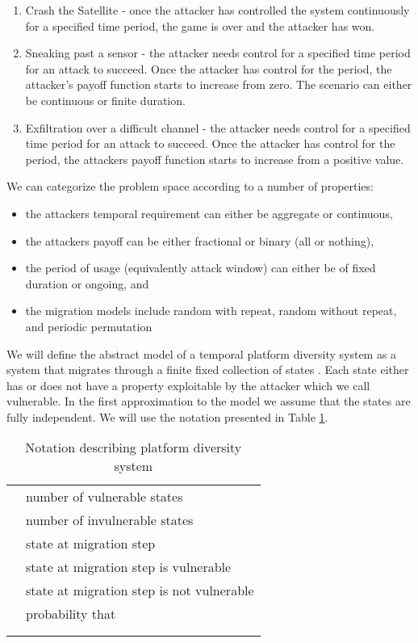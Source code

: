 \documentclass{acm_proc_article-sp}
\providecommand{\tabularnewline}{\\}
\begin{document}
\begin{enumerate}
\item Crash the Satellite - once the attacker has controlled the system
continuously for a specified time period, the game is over and the
attacker has won.
\item Sneaking past a sensor - the attacker needs control for a specified
time period for an attack to succeed. Once the attacker has control
for the period, the attacker's payoff function starts to increase from
zero. The scenario can either be continuous or finite duration.
\item Exfiltration over a difficult channel - the attacker needs control
for a specified time period for an attack to succeed. Once the attacker
has control for the period, the attackers payoff function starts to
increase from a positive value.
\end{enumerate}
We can categorize the problem space according to a number of properties:
\begin{itemize}
\item the attackers temporal requirement can either be aggregate or continuous,
\item the attackers payoff can be either fractional or binary (all or nothing),
\item the period of usage (equivalently attack window) can either be of fixed
duration or ongoing, and
\item the migration models include random with repeat, random without repeat,
and periodic permutation
\end{itemize}
We will define the abstract model of a temporal platform diversity
system  as a system that migrates through a finite fixed collection
of states . Each state either has or does
not have a property exploitable by the attacker which we call vulnerable. In the first approximation to the model we assume that the states are fully independent. We will use the notation presented in Table \ref{table:notation}.

\begin{table}[t]
\begin{tabular}{|l|l|}
\hline 
  & number of vulnerable states\tabularnewline
  & number of invulnerable states \tabularnewline
 & state at migration step \tabularnewline
 & state at migration step  is vulnerable\tabularnewline
 & state at migration step  is not vulnerable\tabularnewline
 & probability that \tabularnewline
 &  \tabularnewline
 & \tabularnewline
\hline 
\end{tabular}
\caption{Notation describing platform diversity system}
\label{table:notation}
\end{table}
\end{document}
